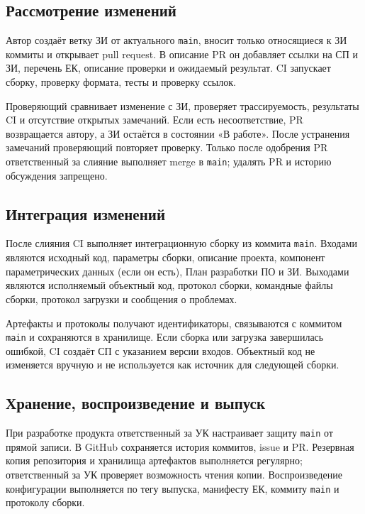 \documentclass{tpks}
\begin{document}
\subsection{Рассмотрение изменений}

Автор создаёт ветку ЗИ от актуального \texttt{main}, вносит только относящиеся к
ЗИ коммиты и открывает pull request. В описание PR он добавляет ссылки на СП и
ЗИ, перечень ЕК, описание проверки и ожидаемый результат. CI запускает сборку,
проверку формата, тесты и проверку ссылок.

Проверяющий сравнивает изменение с ЗИ, проверяет трассируемость, результаты CI и
отсутствие открытых замечаний. Если есть несоответствие, PR возвращается автору,
а ЗИ остаётся в состоянии «В работе». После устранения замечаний проверяющий
повторяет проверку. Только после одобрения PR ответственный за слияние выполняет
merge в \texttt{main}; удалять PR и историю обсуждения запрещено.

\subsection{Интеграция изменений}

После слияния CI выполняет интеграционную сборку из коммита \texttt{main}.
Входами являются исходный код, параметры сборки, описание проекта, компонент
параметрических данных (если он есть), План разработки ПО и ЗИ. Выходами
являются исполняемый объектный код, протокол сборки, командные файлы сборки,
протокол загрузки и сообщения о проблемах.

Артефакты и протоколы получают идентификаторы, связываются с коммитом \texttt{main}
и сохраняются в хранилище. Если сборка или загрузка завершилась ошибкой, CI
создаёт СП с указанием версии входов. Объектный код не изменяется вручную и не
используется как источник для следующей сборки.

\subsection{Хранение, воспроизведение и выпуск}

При разработке продукта ответственный за УК настраивает защиту \texttt{main} от прямой записи. В GitHub сохраняется история коммитов, issue и
PR. Резервная копия репозитория и хранилища артефактов выполняется регулярно;
ответственный за УК проверяет возможность чтения копии. Воспроизведение
конфигурации выполняется по тегу выпуска, манифесту ЕК, коммиту \texttt{main} и
протоколу сборки.
\end{document}
